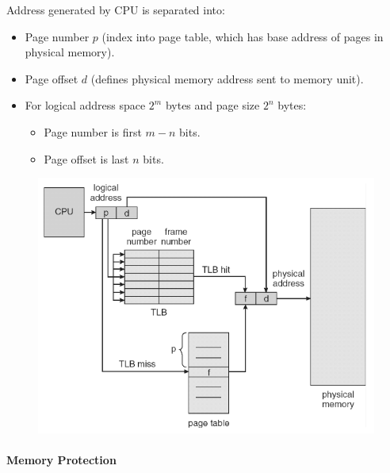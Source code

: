 \documentclass[twocolumn,english]{article}
\begin{document}
Address generated by CPU is separated into: 
\begin{itemize}
\item Page number $p$ (index into page table, which has base address of
pages in physical memory). 
\item Page offset $d$ (defines physical memory address sent to memory unit). 
\item For logical address space $2^{m}$ bytes and page size $2^{n}$ bytes: 

\begin{itemize}
\item Page number is first $m-n$ bits. 
\item Page offset is last $n$ bits. 
\end{itemize}
\end{itemize}
\begin{figure}[H]
\centering{}\includegraphics[width=0.75\linewidth]{img/address-translation} 
\end{figure}



\paragraph{Memory Protection}
\end{document}
